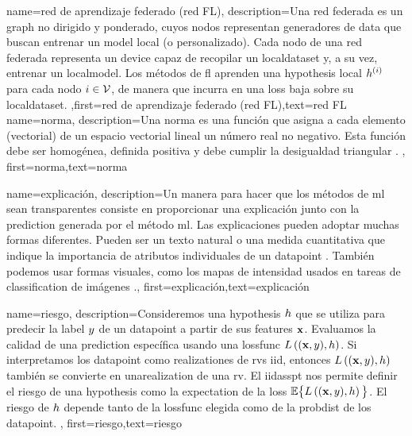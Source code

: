 {name={red de aprendizaje federado (red FL)},
	description={Una red federada es un \gls{graph} no dirigido y ponderado, 
	cuyos nodos representan generadores de \gls{data} que buscan entrenar un \gls{model} local (o personalizado). 
	Cada nodo de una red federada representa un \gls{device} capaz de recopilar un \gls{localdataset}
	y, a su vez, entrenar un \gls{localmodel}. 
	Los métodos de \gls{fl} aprenden una \gls{hypothesis} local $h^{(i)}$ para
	cada nodo $i \in \mathcal{V}$, de manera que incurra en una \gls{loss} baja sobre su \gls{localdataset}.
	,first={red de aprendizaje federado (red FL)},text={red FL} 
} }
{name={norma},
	description={Una norma es una función que asigna a cada elemento (vectorial) de un espacio 
		vectorial lineal un número real no negativo. Esta función debe ser homogénea, definida positiva y debe 
		cumplir la desigualdad triangular \cite{HornMatAnalysis}. },
	first={norma},text={norma} 
}

{name={explicación},
	description={Un manera para hacer que los métodos de \gls{ml} sean transparentes consiste en  
		proporcionar una explicación junto con la \gls{prediction} generada por el método 
		\gls{ml}. Las explicaciones pueden adoptar muchas formas diferentes. Pueden ser un texto natural
		o una medida cuantitativa que indique la importancia de atributos individuales
		de un \gls{datapoint} \cite{Molnar2019}.
 		También podemos usar formas visuales, como los mapas de intensidad usados en tareas de \gls{classification} de imágenes \cite{GradCamPaper}.},
		first={explicación},text={explicación} 
}

{name={riesgo},
	description={Consideremos una \gls{hypothesis} $h$ que se utiliza para predecir la \gls{label} 
		$y$ de un \gls{datapoint} a partir de sus \gls{feature}s ${\bf x}$. Evaluamos 
		la calidad de una \gls{prediction} específica usando una \gls{lossfunc} $L\left(({\bf x},y),h \right)$. 
		Si interpretamos los  \gls{datapoint} como \gls{realization}es de \gls{rv}s \gls{iid}, 
		entonces $L\left(({\bf x},y),h \right)$ también se convierte en una\gls{realization} 
		de una \gls{rv}. El \gls{iidasspt} nos permite definir el riesgo de una \gls{hypothesis} 
		como la \gls{expectation} de la \gls{loss} $\mathbb{E} \big\{L\left(({\bf x},y),h \right) \big\}$. 
		El riesgo de $h$ depende tanto de la \gls{lossfunc} elegida como de la \gls{probdist} de los \gls{datapoint}.
		},
	first={riesgo},text={riesgo} 
}


